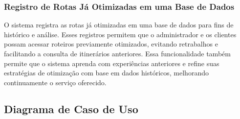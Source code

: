 \subsubsection{Registro de Rotas Já Otimizadas em uma Base de Dados}
O sistema registra as rotas já otimizadas em uma base de dados para fins de histórico e análise. Esses registros permitem que o administrador e os clientes possam acessar roteiros previamente otimizados, evitando retrabalhos e facilitando a consulta de itinerários anteriores. Essa funcionalidade também permite que o sistema aprenda com experiências anteriores e refine suas estratégias de otimização com base em dados históricos, melhorando continuamente o serviço oferecido.

\subsection{Diagrama de Caso de Uso}
